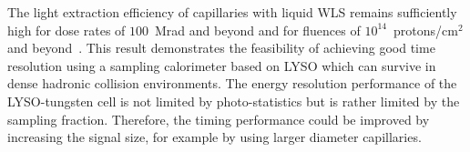 The light extraction efficiency of capillaries with liquid WLS remains
sufficiently high for dose rates of $100$~Mrad and beyond and for fluences of
$10^{14}$~protons/$\mathrm{cm}^{2}$ and beyond~\cite{shashlik2}. This result
demonstrates the feasibility of achieving good time resolution using a sampling
calorimeter based on LYSO which can survive in dense hadronic collision environments.
The energy resolution performance of the LYSO-tungsten cell is not limited by
photo-statistics but is rather limited by the sampling fraction. Therefore, the timing
performance could be improved by increasing the signal size, for example by 
using larger diameter capillaries.\\ 

